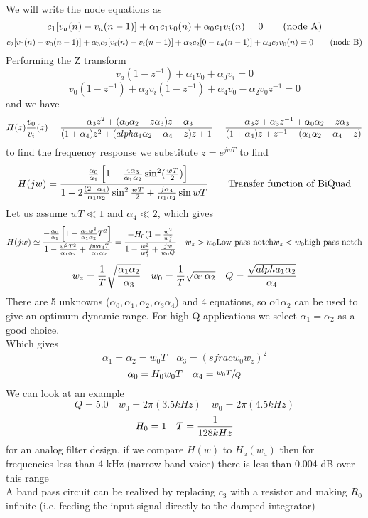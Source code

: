 \documentclass[11pt,fleqn]{book} %
\begin{document}
We will write the node equations as
\begin{equation}
 c_1[v_a(n)-v_a(n-1)]+\alpha_1c_1v_0(n)+\alpha_0c_1v_i(n)=0 \tag{\text{node A}}
\end{equation}
\begin{equation}
 c_2[v_0(n)-v_0(n-1)]+\alpha_3c_2[v_i(n)-v_i(n-1)]+\alpha_2c_2[0-v_a(n-1)]+\alpha_4c_2v_0(n)=0 \tag{\text{node B}}
\end{equation}
Performing the Z transform
$$v_a(1-z^{-1})+\alpha_1v_0+\alpha_0v_i=0$$
$$v_0(1-z^{-1})+\alpha_3v_i(1-z^{-1})+\alpha_4v_0-\alpha_2v_0z^{-1}=0$$
and we have
$$H(z){v_0\over v_i}(z)={-\alpha_3z^2+(\alpha_0\alpha_2-z\alpha_3)z+\alpha_3\over(1+\alpha_4)z^2+(alpha_1\alpha_2-\alpha_4-z)z+1}={-\alpha_3z+\alpha_3z^{-1}+\alpha_0\alpha_2-z\alpha_3\over (1+\alpha_4)z+z^{-1}+(\alpha_1\alpha_2-\alpha_4-z)}$$
to find the frequency response we substitute $z=e^{jwT}$ to find
$$H(jw)={-{\alpha_0\over\alpha_1}\left[1-{4\alpha_3\over\alpha_1\alpha_2}\sin^2({wT\over2})\right]\over1-2{(2+\alpha_4)\over\alpha_1\alpha_2}\sin^2{wT\over2}+{j\alpha_4\over\alpha_1\alpha_2}\sin wT}\qquad\text{Transfer function of BiQuad}$$
Let us assume $wT\ll1$ and $\alpha_4\ll2$, which gives
$$H(jw)\simeq{-{\alpha_0\over\alpha_1}\left[1-{\alpha_3w^2\over\alpha_1\alpha_2}T^2\right]\over1-{w^2T^2\over\alpha_1\alpha_2}+{jw\alpha_4T\over\alpha_1\alpha_2}}={-H_0(1-{w^2\over w_z^2}\over 1-{w^2\over w_0^2}+{jw\over  w_0Q}}\quad\text{$w_z>w_0$\\Low pass notch\\$w_z<w_0$\\high pass notch}$$
$$w_z={1\over T}\sqrt{\alpha_1\alpha_2\over\alpha_3}\quad w_0={1\over T}\sqrt{\alpha_1\alpha_2}\quad Q={\sqrt{alpha_1\alpha_2}\over \alpha_4}$$
There are 5 unknowns ($\alpha_0,\alpha_1,\alpha_2,\alpha_3\alpha_4$) and 4 equations, so $\alpha1\alpha_2$ can be used to give an optimum dynamic range. For high Q applications we select $\alpha_1=\alpha_2$ as a good choice.\\
Which gives
$$\alpha_1=\alpha_2=w_0T\quad\alpha_3=(sfrac{w_0}{w_z})^2$$
$$\alpha_0=H_0w_0T\quad\alpha_4=\sfrac{w_0T}{Q}$$
We can look at an example
$$Q=5.0\quad w_0=2\pi(3.5 kHz)\quad w_0=2\pi(4.5 kHz)$$
$$H_0=1\quad T={1\over 128 kHz}$$
for an analog filter design. if we compare $H(w)$ to $H_a(w_a)$ then for frequencies less than 4 kHz (narrow band voice) there is less than 0.004 dB over this range\\
A band pass circuit can be realized by replacing $c_3$ with a resistor and making $R_0$ infinite (i.e. feeding the input signal directly to the damped integrator)
\end{document}
